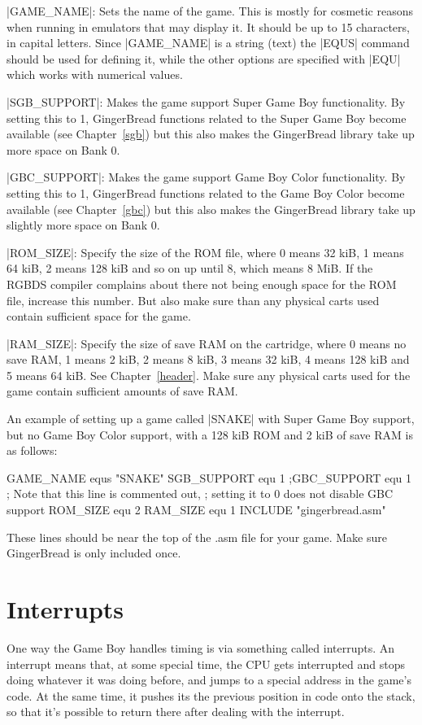 \documentclass[11pt]{book}
\begin{document}
|GAME_NAME|: Sets the name of the game. This is mostly for cosmetic reasons when running in emulators that may display it. It should be up to 15 characters, in capital letters. Since |GAME_NAME| is a string (text) the |EQUS| command should be used for defining it, while the other options are specified with |EQU| which works with numerical values.

|SGB_SUPPORT|: Makes the game support Super Game Boy functionality. By setting this to 1, GingerBread functions related to the Super Game Boy become available (see Chapter~\ref{sgb}) but this also makes the GingerBread library take up more space on Bank 0.

|GBC_SUPPORT|: Makes the game support Game Boy Color functionality. By setting this to 1, GingerBread functions related to the Game Boy Color become available (see Chapter~\ref{gbc}) but this also makes the GingerBread library take up slightly more space on Bank 0. 

|ROM_SIZE|: Specify the size of the ROM file, where 0 means 32 kiB, 1 means 64 kiB, 2 means 128 kiB and so on up until 8, which means 8 MiB. If the RGBDS compiler complains about there not being enough space for the ROM file, increase this number. But also make sure than any physical carts used contain sufficient space for the game.

|RAM_SIZE|: Specify the size of save RAM on the cartridge, where 0 means no save RAM, 1 means 2 kiB, 2 means 8 kiB, 3 means 32 kiB, 4 means 128 kiB and 5 means 64 kiB. See Chapter~\ref{header}. Make sure any physical carts used for the game contain sufficient amounts of save RAM.

An example of setting up a game called |SNAKE| with Super Game Boy support, but no Game Boy Color support, with a 128 kiB ROM and 2 kiB of save RAM is as follows:

\begin{code}
GAME_NAME equs "SNAKE"
SGB_SUPPORT equ 1
;GBC_SUPPORT equ 1 ; Note that this line is commented out, 
; setting it to 0 does not disable GBC support
ROM_SIZE equ 2
RAM_SIZE equ 1
INCLUDE "gingerbread.asm"
\end{code}

These lines should be near the top of the .asm file for your game. Make sure GingerBread is only included once.
 
\section{Interrupts} 
\label{weinterruptthisprogramme}
One way the Game Boy handles timing is via something called interrupts. An interrupt means that, at some special time, the CPU gets interrupted and stops doing whatever it was doing before, and jumps to a special address in the game's code. At the same time, it pushes its the previous position in code onto the stack, so that it's possible to return there after dealing with the interrupt. 
\end{document}
